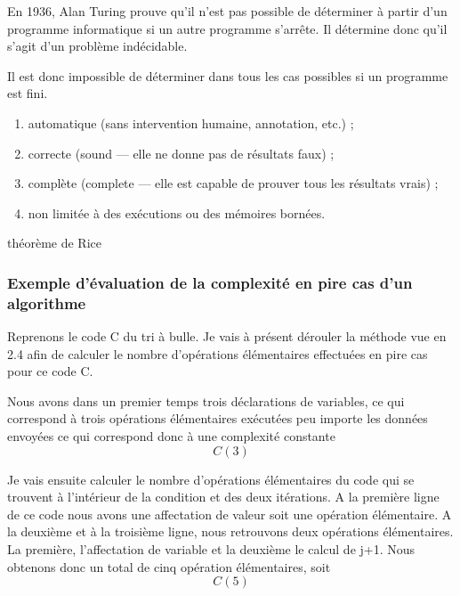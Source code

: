 \documentclass[12pt, twoside, openright]{report}
\begin{document}
En 1936, Alan Turing prouve qu'il n'est pas possible de déterminer à partir d'un programme informatique si un autre programme s'arrête. Il détermine donc qu'il s'agit d'un problème indécidable.

Il est donc impossible de déterminer dans tous les cas possibles si un programme est fini. 
\begin{enumerate}
    \item automatique (sans intervention humaine, annotation, etc.) ;
    \item correcte (sound — elle ne donne pas de résultats faux) ;
    \item complète (complete — elle est capable de prouver tous les résultats
    vrais) ;
    \item non limitée à des exécutions ou des mémoires bornées.
\end{enumerate}
\cite{codesource02} théorème de Rice

\subsubsection{Exemple d'évaluation de la complexité en pire cas d'un algorithme}


Reprenons le code C du tri à bulle. Je vais à présent dérouler la méthode vue en 2.4 afin de calculer le nombre d'opérations élémentaires effectuées en pire cas pour ce code C. 

Nous avons dans un premier temps trois déclarations de variables, ce qui correspond à trois opérations élémentaires exécutées peu importe les données envoyées ce qui correspond donc à une complexité constante \[C(3)\]

Je vais ensuite calculer le nombre d'opérations élémentaires du code qui se trouvent à l'intérieur de la condition et des deux itérations. A la première ligne de ce code nous avons une affectation de valeur soit une opération élémentaire. A la deuxième et à la troisième ligne, nous retrouvons deux opérations élémentaires. La première, l'affectation de variable et la deuxième le calcul de j+1. Nous obtenons donc un total de cinq opération élémentaires, soit \[C(5)\]
\end{document}
